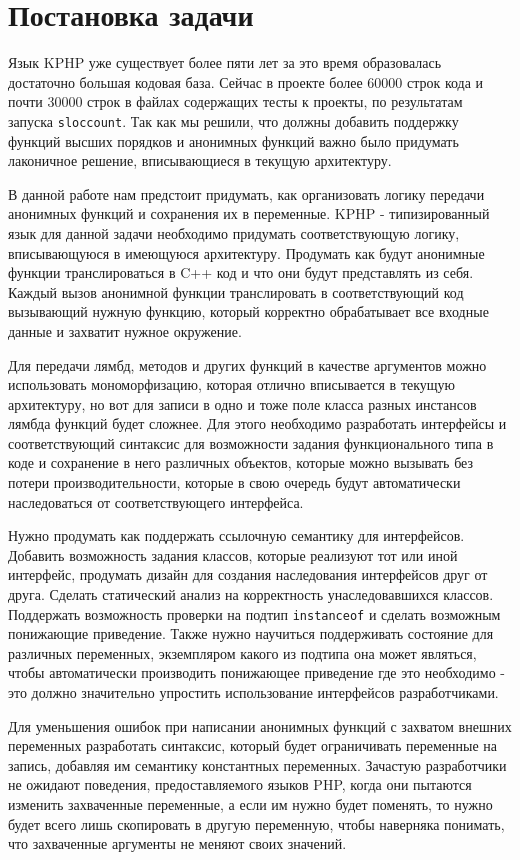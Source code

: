 
\chapter{Постановка задачи}
Язык KPHP уже существует более пяти лет за это время образовалась достаточно большая кодовая база.
Сейчас в проекте более 60000 строк кода и почти 30000 строк в файлах содержащих тесты к проекты, по результатам запуска \verb|sloccount|\cite{sloccount}. Так как мы решили, что должны добавить поддержку функций высших порядков и анонимных функций важно было придумать лаконичное решение, вписывающиеся в текущую архитектуру.

В данной работе нам предстоит придумать, как организовать логику передачи анонимных функций и сохранения их в переменные. KPHP - типизированный язык для данной задачи необходимо придумать соответствующую логику, вписывающуюся в имеющуюся архитектуру. Продумать как будут анонимные функции транслироваться в C++ код и что они будут представлять из себя. Каждый вызов анонимной функции транслировать в соответствующий код вызывающий нужную функцию, который корректно обрабатывает все входные данные и захватит нужное окружение.

Для передачи лямбд, методов и других функций в качестве аргументов можно использовать мономорфизацию, которая отлично вписывается в текущую архитектуру, но вот для записи в одно и тоже поле класса разных инстансов лямбда функций будет сложнее. Для этого необходимо разработать интерфейсы и соответствующий синтаксис для возможности задания функционального типа в коде и сохранение в него различных объектов, которые можно вызывать без потери производительности, которые в свою очередь будут автоматически наследоваться от соответствующего интерфейса. 

Нужно продумать как поддержать ссылочную семантику для интерфейсов. Добавить возможность задания классов, которые реализуют тот или иной интерфейс, продумать дизайн для создания наследования интерфейсов друг от друга. Сделать статический анализ на корректность унаследовавшихся классов. Поддержать возможность проверки на подтип \verb|instanceof| и сделать возможным понижающие приведение. Также нужно научиться поддерживать состояние для различных переменных, экземпляром какого из подтипа она может являться, чтобы автоматически производить понижающее приведение где это необходимо - это должно значительно упростить использование интерфейсов разработчиками.

Для уменьшения ошибок при написании анонимных функций с захватом внешних переменных разработать синтаксис, который будет ограничивать переменные на запись, добавляя им семантику константных переменных. Зачастую разработчики не ожидают поведения, предоставляемого языков PHP, когда они пытаются изменить захваченные переменные, а если им нужно будет поменять, то нужно будет всего лишь скопировать в другую переменную, чтобы наверняка понимать, что захваченные аргументы не меняют своих значений.

